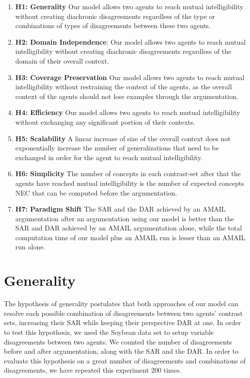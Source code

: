 \begin{enumerate}
    \item \textbf{H1: Generality} Our model allows two agents to reach mutual intelligibility without creating diachronic disagreements regardless of the type or combinations of types of disagreements between these two agents.
    \item \textbf{H2: Domain Independence}: Our model allows two agents to reach mutual intelligibility without creating diachronic disagreements regardless of the domain of their overall context.
    \item \textbf{H3: Coverage Preservation} Our model allows two agents to reach mutual intelligibility without restraining the context of the agents, as the overall context of the agents should not lose examples through the argumentation.
    \item \textbf{H4: Efficiency} Our model allows two agents to reach mutual intelligibility without exchanging any significant portion of their contexts.
    \item \textbf{H5: Scalability} A linear increase of size of the overall context does not exponentially increase the number of generalizations that need to be exchanged in order for the agent to reach mutual intelligibility.
    \item \textbf{H6: Simplicity} The number of concepts in each contrast-set after that the agents have reached mutual intelligibility is the number of expected concepts NEC that can be computed before the argumentation.
    \item \textbf{H7: Paradigm Shift} The SAR and the DAR achieved by an AMAIL argumentation after an argumentation using our model is better than the SAR and DAR achieved by an AMAIL argumentation alone, while the total computation time of our model plus an AMAIL run is lesser than an AMAIL run alone.
\end{enumerate}

\section{Generality}

The hypothesis of generality postulates that both approaches of our model can resolve each possible combination of disagreements between two agents' contrast sets, increasing their SAR while keeping their perspective DAR at one. In order to test this hypothesis, we used the Soybean data set to setup variable disagreements between two agents. We counted the number of disagreements before and after argumentation, along with the SAR and the DAR. In order to evaluate this hypothesis on a great number of disagreements and combinations of disagreements, we have repeated this experiment 200 times.

